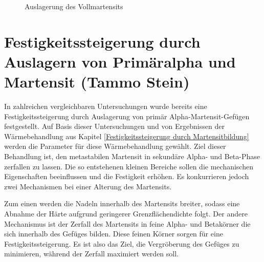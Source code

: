 \documentclass[a4paper, 11pt]{tubsreprt}
\begin{document}
\begin{figure}
\caption{Auslagerung des Vollmartensits}
\label{Auslagerung des Vollmartensits}
\end{figure}

\newpage


\section{Festigkeitssteigerung durch Auslagern von Primäralpha und Martensit (Tammo Stein)}\label{Primäralpha und martensit}
In zahlreichen vergleichbaren Untersuchungen wurde bereits eine Festigkeitssteigerung durch Auslagerung von primär Alpha-Martensit-Gefügen festgestellt. Auf Basis dieser Untersuchungen und von Ergebnissen der Wärmebehandlung aus Kapitel \ref{Festigkeitssteigerung durch Martensitbildung} werden die Parameter für diese Wärmebehandlung gewählt. Ziel dieser Behandlung ist, den metastabilen Martensit in sekundäre Alpha- und Beta-Phase zerfallen zu lassen. Die so entstehenen kleinen Bereiche sollen die mechanischen Eigenschaften beeinflussen und die Festigkeit erhöhen\cite{Gilbert2004}. Es konkurrieren jedoch zwei Mechanismen bei einer Alterung des Martensits. 

Zum einen werden die Nadeln innerhalb des Martensits breiter, sodass eine Abnahme der Härte aufgrund geringerer Grenzflächendichte folgt. Der andere Mechanismus ist der Zerfall des Martensits in feine Alpha- und Betakörner die sich innerhalb des Gefüges bilden. Diese feinen Körner sorgen für eine Festigkeitssteigerung. Es ist also das Ziel, die Vergröberung des Gefüges zu minimieren, während der Zerfall maximiert werden soll. 
\end{document}

